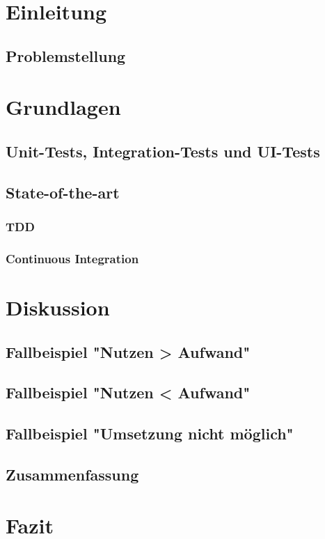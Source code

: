 \chapter{Einleitung}
\section{Problemstellung}
\chapter{Grundlagen}
\section{Unit-Tests, Integration-Tests und UI-Tests}
\section{State-of-the-art}
\subsection{TDD}
\subsection{Continuous Integration}
\chapter{Diskussion}
\section{Fallbeispiel "Nutzen > Aufwand"}
\section{Fallbeispiel "Nutzen < Aufwand"}
\section{Fallbeispiel "Umsetzung nicht möglich"}
\section{Zusammenfassung}
\chapter{Fazit}